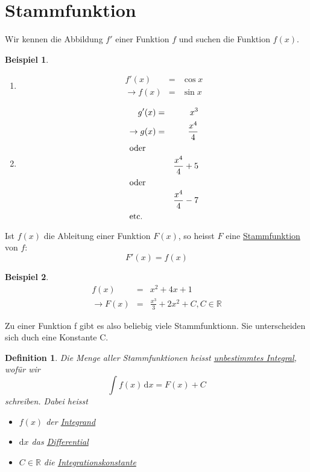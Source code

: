 \documentclass[a4paper,10pt]{report}
\newtheorem{mydef}{Definition}
\newtheorem{myexample}{Beispiel}
\newcommand{\R}{{\mathbb R}}
\begin{document}
\section{Stammfunktion}
Wir kennen die Abbildung $f'$ einer Funktion $f$ und suchen die Funktion $f(x)$.\\
\begin{myexample}
	\begin{enumerate}
		\item
		\begin{eqnarray*}
			f'(x) &=& \cos x\\
			\to f(x) &=& \sin x
		\end{eqnarray*}
		\item
		\begin{eqnarray*}
			g'(x) &=& x^3 \\
			\to g(x) &=& \frac{x^4}{4}\\
			\shortintertext{oder}
			&&\frac{x^4}{4} + 5\\
			\shortintertext{oder}
			&&\frac{x^4}{4} -7\\
			\shortintertext{etc.}
		\end{eqnarray*}
	\end{enumerate}
\end{myexample}
\noindent
Ist $f(x)$ die Ableitung einer Funktion $F(x)$, so heisst $F$ eine \underline{Stammfunktion} von $f$:
\begin{equation*}F'(x) = f(x)\end{equation*}
\begin{myexample}
	\begin{eqnarray*}
		f(x) &= &x^2+4x+1\\
		\to F(x) &=& \frac{x^3}{3} + 2 x^2+ C, C \in \R
	\end{eqnarray*}
\end{myexample}
\noindent
Zu einer Funktion f gibt es also beliebig viele Stammfunktionn. Sie unterscheiden sich duch eine Konstante C.\\
\begin{mydef}
	Die Menge aller Stammfunktionen heisst \underline{unbestimmtes Integral}, wofür wir
	\begin{equation*}\int \! f(x) \, \mathrm{d} x = F(x) + C\end{equation*}
	schreiben. Dabei heisst
	\begin{itemize}
		\item $f(x)$ der \underline{Integrand}
		\item $\mathrm{d}x$ das \underline{Differential}
		\item $C \in \mathbb{R}$ die \underline{Integrationskonstante}
	\end{itemize}
\end{mydef}
\end{document}
